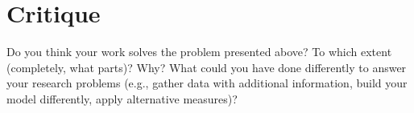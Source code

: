\section{Critique}
\label{critique}

Do you think your work solves the problem presented above? To which
extent (completely, what parts)? Why? What could you have done
differently to answer your research problems (e.g., gather data with
additional information, build your model differently, apply alternative
measures)?
